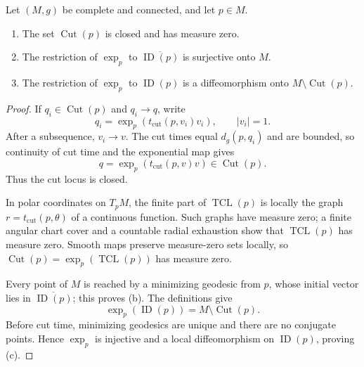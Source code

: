 \begin{theorem}
\label{thm:cut-locus-properties}

Let $(M,g)$ be complete and connected, and let $p\in M$.
\begin{enumerate}
\item[(a)] The set $\operatorname{Cut}(p)$ is closed and has measure zero.
\item[(b)] The restriction of $\exp_p$ to
$\overline{\operatorname{ID}(p)}$ is surjective onto $M$.
\item[(c)] The restriction of $\exp_p$ to $\operatorname{ID}(p)$ is a
diffeomorphism onto $M\setminus\operatorname{Cut}(p)$.
\end{enumerate}

\begin{proof}
\sketch If $q_i\in\operatorname{Cut}(p)$ and $q_i\to q$, write
\[
q_i=\exp_p(t_{\mathrm{cut}}(p,v_i)v_i),
\qquad |v_i|=1.
\]
After a subsequence, $v_i\to v$. The cut times equal $d_g(p,q_i)$ and are
bounded, so continuity of cut time and the exponential map gives
\[
q=\exp_p(t_{\mathrm{cut}}(p,v)v)\in\operatorname{Cut}(p).
\]
Thus the cut locus is closed.

In polar coordinates on $T_pM$, the finite part of
$\operatorname{TCL}(p)$ is locally the graph
$r=t_{\mathrm{cut}}(p,\theta)$ of a continuous function. Such graphs have
measure zero; a finite angular chart cover and a countable radial exhaustion
show that $\operatorname{TCL}(p)$ has measure zero. Smooth maps preserve
measure-zero sets locally, so
$\operatorname{Cut}(p)=\exp_p(\operatorname{TCL}(p))$ has measure zero.

Every point of $M$ is reached by a minimizing geodesic from $p$, whose initial
vector lies in $\overline{\operatorname{ID}(p)}$; this proves (b). The
definitions give
\[
\exp_p(\operatorname{ID}(p))=M\setminus\operatorname{Cut}(p).
\]
Before cut time, minimizing geodesics are unique and there are no conjugate
points. Hence $\exp_p$ is injective and a local diffeomorphism on
$\operatorname{ID}(p)$, proving (c).
\end{proof}
\end{theorem}

